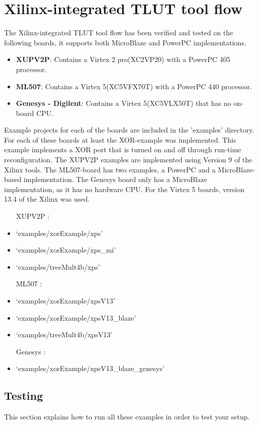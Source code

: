 \documentclass[a4paper,oneside]{memoir}
\begin{document}
\clearpage
\chapter{Xilinx-integrated TLUT tool flow}\label{sec:xilinx_flow}

The Xilinx-integrated TLUT tool flow has been verified and tested on the following boards, it supports both MicroBlaze and PowerPC implementations.
\begin{itemize}
	\item \textbf{XUPV2P}: Contains a Virtex 2 pro(XC2VP20) with a PowerPC 405 processor.
	\item \textbf{ML507}: Contains a Virtex 5(XC5VFX70T) with a PowerPC 440 processor.
	\item \textbf{Genesys - Digilent}: Contains a Virtex 5(XC5VLX50T) that has no on-board CPU.
\end{itemize}

Example projects for each of the boards are included in the 'examples' directory. For each of these boards at least the XOR-example was implemented. This example implements a XOR port that is turned on and off through run-time reconfiguration. The XUPV2P examples are implemented using Version 9 of the Xilinx tools. The ML507-board has two examples, a PowerPC and a MicroBlaze-based implementation. The Genesys board only has a MicroBlaze implementation, as it has no hardware CPU. For the Virtex 5 boards, version 13.4 of the Xilinx was used.

\begin{itemize}
\item[XUPV2P :]
\item `examples/xorExample/xps'
\item `examples/xorExample/xps\_mi'
\item `examples/treeMult4b/xps'
\item[ML507 :]
\item `examples/xorExample/xpsV13'
\item `examples/xorExample/xpsV13\_blaze'
\item `examples/treeMult4b/xpsV13'
\item[Genesys :]
\item `examples/xorExample/xpsV13\_blaze\_genesys'
\end{itemize}

\section{Testing}\label{sec:xilinx_testing}
This section explains how to run all these examples in order to test your setup.
\end{document}
